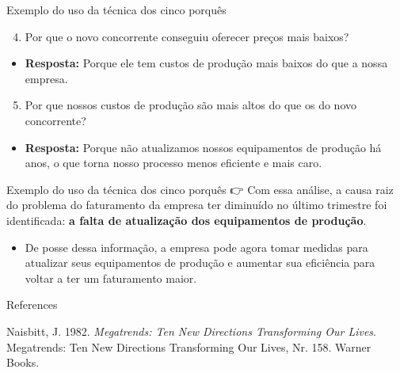 \documentclass[
  ignorenonframetext,
  aspectratio=169,
]{beamer}
\newlength{\cslhangindent}
\newenvironment{CSLReferences}[2] %
 {\begin{list}{}{%
  \setlength{\itemindent}{0pt}
  \setlength{\leftmargin}{0pt}
  \setlength{\parsep}{0pt}
  \ifodd #1
   \setlength{\leftmargin}{\cslhangindent}
   \setlength{\itemindent}{-1\cslhangindent}
  \fi
  \setlength{\itemsep}{#2\baselineskip}}}
 {\end{list}}
\providecommand{\tightlist}{%
  \setlength{\itemsep}{0pt}\setlength{\parskip}{0pt}}
\begin{document}
\begin{frame}{Exemplo do uso da técnica dos cinco porquês}
\label{exemplo-do-uso-da-tuxe9cnica-dos-cinco-porquuxeas-1}
\begin{enumerate}
\setcounter{enumi}{3}
\tightlist
\item
  Por que o novo concorrente conseguiu oferecer preços mais baixos?
\end{enumerate}

\begin{itemize}
\tightlist
\item
  \textbf{Resposta:} Porque ele tem custos de produção mais baixos do
  que a nossa empresa.
\end{itemize}

\pause

\begin{enumerate}
\setcounter{enumi}{4}
\tightlist
\item
  Por que nossos custos de produção são mais altos do que os do novo
  concorrente?
\end{enumerate}

\begin{itemize}
\tightlist
\item
  \textbf{Resposta:} Porque não atualizamos nossos equipamentos de
  produção há anos, o que torna nosso processo menos eficiente e mais
  caro.
\end{itemize}
\end{frame}

\begin{frame}{Exemplo do uso da técnica dos cinco porquês}
\label{exemplo-do-uso-da-tuxe9cnica-dos-cinco-porquuxeas-2}
👉 Com essa análise, a causa raiz do problema do faturamento da empresa
ter diminuído no último trimestre foi identificada: \textbf{a falta de
atualização dos equipamentos de produção}.

\pause

\begin{itemize}
\tightlist
\item
  De posse dessa informação, a empresa pode agora tomar medidas para
  atualizar seus equipamentos de produção e aumentar sua eficiência para
  voltar a ter um faturamento maior.
\end{itemize}
\end{frame}

\begin{frame}{References}
\label{references}
\label{refs}
\begin{CSLReferences}{1}{0}
Naisbitt, J. 1982. \emph{Megatrends: Ten New Directions Transforming Our
Lives}. Megatrends: Ten New Directions Transforming Our Lives, Nr. 158.
Warner Books.

\end{CSLReferences}
\end{frame}
\end{document}
